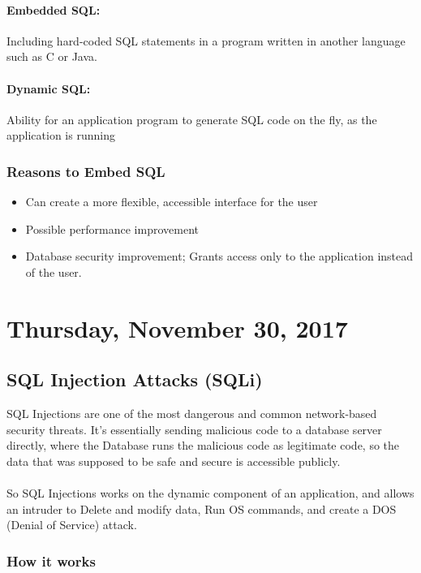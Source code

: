 \documentclass[12pt]{article}
\begin{document}
\paragraph{Embedded SQL:} Including hard-coded SQL statements in a program written in another language such as C or Java.

\paragraph{Dynamic SQL:} Ability for an application program to generate SQL code on the fly, as the application is running

\subsubsection{Reasons to Embed SQL}

\begin{itemize}
	\item{Can create a more flexible, accessible interface for the user}
	\item{Possible performance improvement}
	\item{Database security improvement; Grants access only to the application instead of the user.}
\end{itemize}

\newpage

\section{Thursday, November 30, 2017}

\subsection{SQL Injection Attacks (SQLi)}

SQL Injections are one of the most dangerous and common network-based security threats. It's essentially sending malicious code to a database server directly, where the Database runs the malicious code as legitimate code, so the data that was supposed to be safe and secure is accessible publicly.\\
\\
So SQL Injections works on the dynamic component of an application, and allows an intruder to Delete and modify data, Run OS commands, and create a DOS (Denial of Service) attack.

\subsubsection{How it works}
\end{document}
